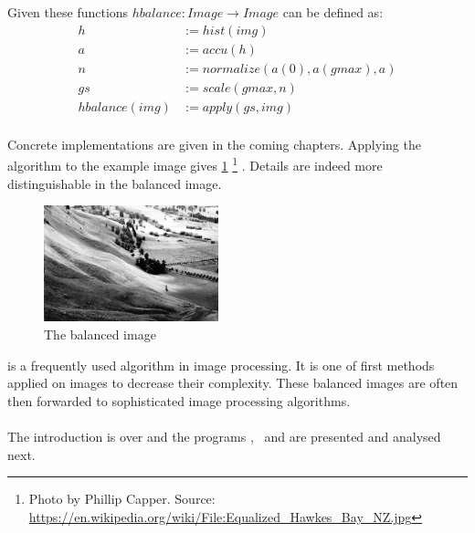     Given these functions $hbalance: Image \rightarrow Image$ can be defined as:
    \begin{equation*}
    \begin{split}
        h & := hist(img) \\
        a & := accu(h) \\
        n & := normalize(a(0), a(gmax), a) \\
        gs & := scale(gmax,n) \\
      hbalance(img) & := apply(gs,img) \\
    \end{split}
    \end{equation*}
    
    Concrete implementations are given in the coming chapters.
    Applying the algorithm to the example image gives \ref{fig:img-eq}
    \footnote{Photo by Phillip Capper. Source: \url{https://en.wikipedia.org/wiki/File:Equalized_Hawkes_Bay_NZ.jpg}}
    . Details are indeed more distinguishable in the balanced image.
    
    \begin{figure}[h]
      \centering
      \includegraphics[width=0.45\textwidth]{img-eq}
      \caption[Balanced Image]{The balanced image}
      \label{fig:img-eq}
    \end{figure}
    
  \algo{} is a frequently used algorithm in image processing. It is 
  one of first methods applied on images to decrease their complexity.
  These balanced images are often then forwarded to sophisticated
  image processing algorithms.
  
  
  \paragraph{}
    The introduction is over and
    the programs \seq, \man\, \ndpn and \ndpv
    are presented and analysed next.
  
